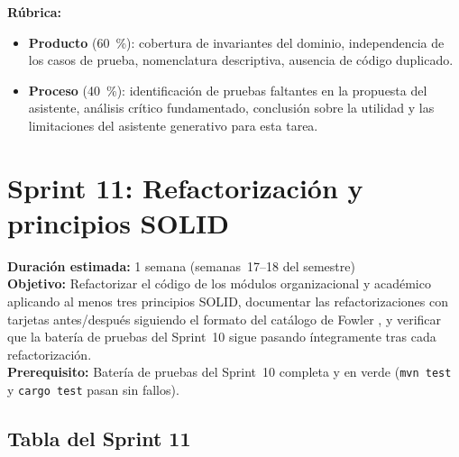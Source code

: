 \begin{tcolorbox}[actividadIA,
  title={Actividad de reflexión (Sprint~10) ---
         Software generativo y pruebas unitarias}]
\bigskip
\textbf{Rúbrica:}
\begin{itemize}
  \item \textbf{Producto} (60~\%): cobertura de invariantes del dominio, independencia
        de los casos de prueba, nomenclatura descriptiva, ausencia de código duplicado.
  \item \textbf{Proceso} (40~\%): identificación de pruebas faltantes en la propuesta
        del asistente, análisis crítico fundamentado, conclusión sobre la utilidad
        y las limitaciones del asistente generativo para esta tarea.
\end{itemize}

\end{tcolorbox}


\section*{Sprint 11: Refactorización y principios SOLID}
\label{sprint:11}

\begin{tcolorbox}[sprintBox, title={Sprint 11 --- Refactorización y principios SOLID}]
  \textbf{Duración estimada:} 1 semana (semanas~17--18 del semestre)\\
  \textbf{Objetivo:} Refactorizar el código de los módulos organizacional y académico
  aplicando al menos tres principios SOLID, documentar las refactorizaciones con tarjetas
  antes/después siguiendo el formato del catálogo de Fowler \parencite{Fowler2018}, y
  verificar que la batería de pruebas del Sprint~10 sigue pasando íntegramente tras
  cada refactorización.\\
  \textbf{Prerequisito:} Batería de pruebas del Sprint~10 completa y en verde
  (\texttt{mvn test} y \texttt{cargo test} pasan sin fallos).
\end{tcolorbox}

\bigskip

\subsection*{Tabla del Sprint 11}

